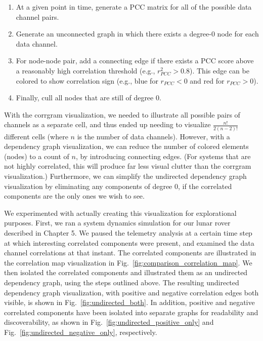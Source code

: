 \begin{enumerate}
    \item At a given point in time, generate a PCC matrix for all of the possible data channel pairs.
    \item Generate an unconnected graph in which there exists a degree-0 node for each data channel.
    \item For node-node pair, add a connecting edge if there exists a PCC score above a reasonably high correlation threshold (e.g., $r_{PCC}^{2} > 0.8$). This edge can be colored to show correlation sign (e.g., blue for $r_{PCC} < 0$ and red for $r_{PCC} > 0$).
    \item Finally, cull all nodes that are still of degree 0.
\end{enumerate}

With the corrgram visualization, we needed to illustrate all possible pairs of channels as a separate cell, and thus ended up needing to visualize $\frac{n!}{2 (n - 2)!}$ different cells (where $n$ is the number of data channels). However, with a dependency graph visualization, we can reduce the number of colored elements (nodes) to a count of $n$, by introducing connecting edges. (For systems that are not highly correlated, this will produce far less visual clutter than the corrgram visualization.) Furthermore, we can simplify the undirected dependency graph visualization by eliminating any components of degree 0, if the correlated components are the only ones we wish to see.

We experimented with actually creating this visualization for explorational purposes. First, we ran a system dynamics simulation for our lunar rover described in Chapter 5. We paused the telemetry analysis at a certain time step at which interesting correlated components were present, and examined the data channel correlations at that instant. The correlated components are illustrated in the correlation map visualization in Fig.~\ref{fig:comparison_correlation_map}. We then isolated the correlated components and illustrated them as an undirected dependency graph, using the steps outlined above. The resulting undirected dependency graph visualization, with positive and negative correlation edges both visible, is shown in Fig.~\ref{fig:undirected_both}. In addition, positive and negative correlated components have been isolated into separate graphs for readability and discoverability, as shown in Fig.~\ref{fig:undirected_positive_only} and Fig.~\ref{fig:undirected_negative_only}, respectively.

